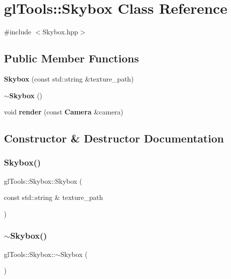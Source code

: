 \section{gl\+Tools\+::Skybox Class Reference}
\label{classgl_tools_1_1_skybox}


{\ttfamily \#include $<$Skybox.\+hpp$>$}

\subsection*{Public Member Functions}
\begin{DoxyCompactItemize}
\item 
\textbf{ Skybox} (const std\+::string \&texture\+\_\+path)
\item 
\textbf{ $\sim$\+Skybox} ()
\item 
void \textbf{ render} (const \textbf{ Camera} \&camera)
\end{DoxyCompactItemize}


\subsection{Constructor \& Destructor Documentation}
\mbox{\label{classgl_tools_1_1_skybox_a70aab3d5884fb25d0326cb4f11db2918}} 
\subsubsection{Skybox()}
{\footnotesize\ttfamily gl\+Tools\+::\+Skybox\+::\+Skybox (\begin{DoxyParamCaption}\item[{const std\+::string \&}]{texture\+\_\+path }\end{DoxyParamCaption})}

\mbox{\label{classgl_tools_1_1_skybox_ad828a1c939989d71cf28885ef1628c17}} 
\subsubsection{$\sim$Skybox()}
{\footnotesize\ttfamily gl\+Tools\+::\+Skybox\+::$\sim$\+Skybox (\begin{DoxyParamCaption}{ }\end{DoxyParamCaption})}



